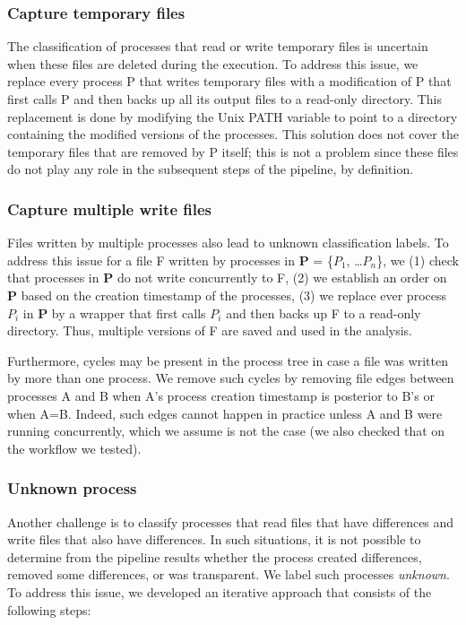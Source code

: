 \documentclass[a4paper,num-refs]{oup-contemporary}
\begin{document}
\subsubsection{Capture temporary files} 
The classification of processes that read or 
write temporary files is uncertain when these files are deleted during 
the execution. To address this issue, we replace every process P that 
writes temporary files with a modification of P that first calls P and 
then backs up all its output files to a read-only directory. This 
replacement is done by modifying the Unix PATH variable to point to a 
directory containing the modified versions of the processes. This 
solution does not cover the temporary files that are removed by P 
itself; this is not a problem since these files do not play any role in 
the subsequent steps of the pipeline, by definition. 

\subsubsection{Capture multiple write files} 
Files written by multiple processes also lead 
to unknown classification labels. To address this issue for a file F 
written by processes in \textbf{P} = \{$P_{1}$, \ldots $P_{n}$\}, we 
(1) check that processes in \textbf{P} do not write concurrently to F, 
(2) we establish an order on \textbf{P} based on the creation timestamp 
of the processes, (3) we replace ever process $P_{i}$ in \textbf{P} by 
a wrapper that first calls $P_{i}$ and then backs up F to a read-only 
directory. Thus, multiple versions of F are saved and used in the 
analysis. 

Furthermore, cycles may be present in the process tree in case a file 
was written by more than one process. We remove such cycles by removing 
file edges between processes A and B when A's process creation 
timestamp is posterior to B's or when A=B. Indeed, such edges cannot 
happen in practice unless A and B were running concurrently, which we 
assume is not the case (we also checked that on the workflow we 
tested). 

\subsubsection{Unknown process} 
Another challenge is to classify processes that 
read files that have differences and write files that also have differences. In 
such situations, it is not possible to determine from the pipeline 
results whether the process created differences, removed some differences, or was 
transparent. We label such processes \emph{unknown}.
To address this issue, we developed an iterative approach that 
consists of the following steps: 
\end{document}
